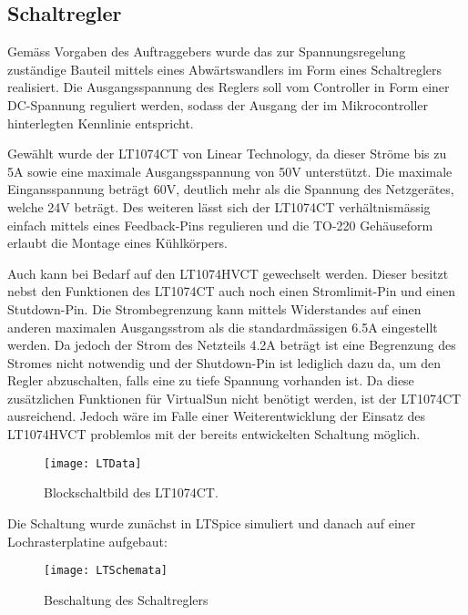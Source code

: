 %
%

\subsection{Schaltregler}\label{schaltregler}

Gemäss Vorgaben des Auftraggebers wurde das zur Spannungsregelung zuständige Bauteil mittels eines Abwärtswandlers im Form eines Schaltreglers realisiert. Die Ausgangsspannung des Reglers soll vom Controller in Form einer DC-Spannung reguliert werden, sodass der Ausgang der im Mikrocontroller hinterlegten Kennlinie entspricht. 

Gewählt wurde der LT1074CT von Linear Technology, da dieser Ströme bis zu 5A sowie eine maximale Ausgangsspannung von 50V unterstützt. Die maximale Eingansspannung beträgt 60V, deutlich mehr als die Spannung des Netzgerätes, welche 24V beträgt.
Des weiteren lässt sich der LT1074CT verhältnismässig einfach mittels eines Feedback-Pins regulieren und die TO-220 Gehäuseform erlaubt die Montage eines Kühlkörpers.

Auch kann bei Bedarf auf den LT1074HVCT gewechselt werden. Dieser besitzt nebst den Funktionen des LT1074CT auch noch einen Stromlimit-Pin und einen Stutdown-Pin. Die Strombegrenzung kann mittels Widerstandes auf einen anderen maximalen Ausgangsstrom als die standardmässigen 6.5A eingestellt werden. Da jedoch der Strom des Netzteils 4.2A beträgt ist eine Begrenzung des Stromes nicht notwendig und  der Shutdown-Pin ist lediglich dazu da, um den Regler abzuschalten, falls eine zu tiefe Spannung vorhanden ist. Da diese zusätzlichen Funktionen für VirtualSun nicht benötigt werden, ist der LT1074CT ausreichend. Jedoch wäre im Falle einer Weiterentwicklung der Einsatz des LT1074HVCT problemlos mit der bereits entwickelten Schaltung möglich.

\begin{figure}[h]
\centering
\texttt{[image: LTData]}%
\caption{Blockschaltbild des LT1074CT.}
\label{fig::LTData}
\end{figure}

Die Schaltung wurde zunächst in LTSpice simuliert und danach auf einer Lochrasterplatine aufgebaut:

\begin{figure}[h]
\centering
\texttt{[image: LTSchemata]}%
\caption{Beschaltung des Schaltreglers}%
\label{fig::LTSchemata}%
\end{figure}

